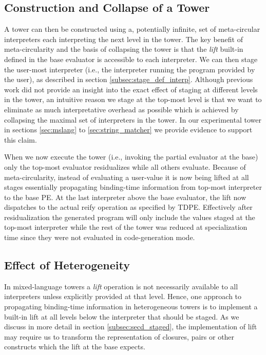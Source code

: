 \documentclass[a4paper,12pt,twoside,openright]{report}
\theoremstyle{definition}
\begin{document}
\subsection{Construction and Collapse of a Tower}
A tower can then be constructed using a, potentially infinite, set of meta-circular interpreters each interpreting the next level in the tower. The key benefit of meta-circularity and the basis of collapsing the tower is that the \textit{lift} built-in defined in the base evaluator is accessible to each interpreter. We can then stage the user-most interpreter (i.e., the interpreter running the program provided by the user), as described in section \ref{subsec:stage_def_interp}. Although previous work did not provide an insight into the exact effect of staging at different levels in the tower, an intuitive reason we stage at the top-most level is that we want to eliminate as much interpretative overhead as possible which is achieved by collapsing the maximal set of interpreters in the tower. In our experimental tower in sections \ref{sec:mslang} to \ref{sec:string_matcher} we provide evidence to support this claim.

When we now execute the tower (i.e., invoking the partial evaluator at the base) only the top-most evaluator residualizes while all others evaluate. Because of meta-circularity, instead of evaluating a user-value it is now being lifted at all stages essentially propagating binding-time information from top-most interpreter to the base PE. At the last interpreter above the base evaluator, the lift now dispatches to the actual reify operation as specified by TDPE. Effectively after residualization the generated program will only include the values staged at the top-most interpreter while the rest of the tower was reduced at specialization time since they were not evaluated in code-generation mode.

\subsection{Effect of Heterogeneity}
In mixed-language towers a \textit{lift} operation is not necessarily available to all interpreters unless explicitly provided at that level. Hence, one approach to propagating binding-time information in heterogeneous towers is to implement a built-in lift at all levels below the interpreter that should be staged. As we discuss in more detail in section \ref{subsec:secd_staged}, the implementation of lift may require us to transform the representation of closures, pairs or other constructs which the lift at the base expects.
\end{document}
